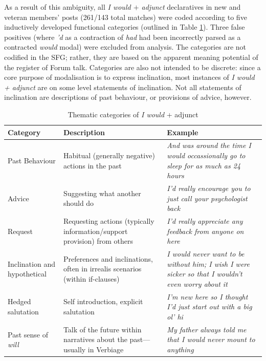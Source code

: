 As a result of this ambiguity, all \emph{I would $+$ adjunct} declaratives in new and veteran \glspl{member}' \glspl{post} (261\slash 143 total matches) were coded according to five inductively developed functional categories (outlined in Table \ref{tab:themcodes}). Three false positives (where \emph{'d} as a contraction of \emph{had} had been incorrectly parsed as a contracted \emph{would} modal) were excluded from analysis. The categories are not codified in the \gls{SFG}; rather, they are based on the apparent meaning potential of the register of \gls{Forum} talk. Categories are also not intended to be discrete: since a core purpose of modalisation is to express inclination, most instances of \emph{I would + adjunct} are on some level statements of inclination. Not all statements of inclination are descriptions of past behaviour, or provisions of advice, however.


   
\begin{table}[htb]
    \centering
    \footnotesize
    \begin{tabularx}{\textwidth}{p{2cm}XX}
    
    \toprule
    Category    & Description & Example       \\ \midrule
    Past Behaviour       & Habitual (generally negative) actions in the past   & \emph{And was around the time I would occassionally go to sleep for as much as 24 hours}     \\ 
    Advice       & Suggesting what another should do & \emph{I'd really encourage you to just call your psychologist back}    \\ 
    Request     & Requesting actions (typically information\slash support provision) from others      & \emph{I'd really appreciate any feedback from anyone on here}          \\
    Inclination and hypothetical & Preferences and inclinations, often in irrealis scenarios (within if-clauses) & \emph{I would never want to be without him; I wish I were sicker so that I wouldn't even worry about it} \\ 
    Hedged salutation            & Self introduction, explicit salutation      & \emph{I'm new here so I thought I'd just start out with a big ol' hi} \\ 
    Past sense of \emph{will}           & Talk of the future within narratives about the past---usually in Verbiage     & \emph{My father always told me that I would never mount to anything}   \\ \bottomrule
    \end{tabularx}
    \caption{Thematic categories of \emph{I would} + adjunct}
    \label{tab:themcodes}
    \end{table}
                    
